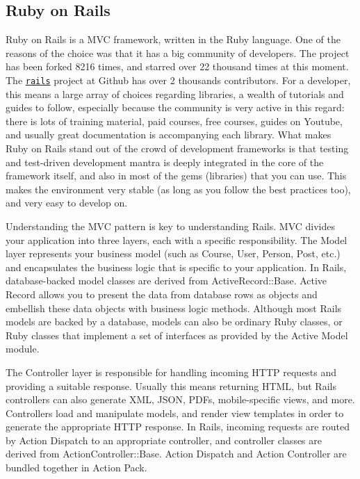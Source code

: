 \subsection{Ruby on Rails}
Ruby on Rails is a MVC framework, written in the Ruby language. One of the reasons of the
choice was that it has a big community of developers. The project has been forked 8216 times,
and starred over 22 thousand times at this moment. The \href{https://github.com/rails/rails}{\texttt{rails}}
project at Github has over 2 thousands contributors.
For a developer, this means a large array of choices regarding libraries, a
wealth of tutorials and guides to follow, especially because the community is very
active in this regard: there is lots of training material, paid courses, free courses,
guides on Youtube, and usually great documentation is accompanying each library.
What makes Ruby on Rails stand out of the crowd of development frameworks is
that testing and test-driven development mantra is deeply
integrated in the core of the framework itself, and also in most of the gems
(libraries) that you can use. This makes the environment very stable (as long as you follow
the best practices too), and very easy to develop on.

Understanding the MVC pattern is key to understanding Rails. MVC divides your
application into three layers, each with a specific responsibility.
The Model layer represents your business model (such as Course, User, Person,
Post, etc.) and encapsulates the business logic that is specific to your
application. In Rails, database-backed model classes are derived from
ActiveRecord::Base. Active Record allows you to present the data from database
rows as objects and embellish these data objects with business logic methods.
Although most Rails models are backed by a database, models can also be ordinary
Ruby classes, or Ruby classes that implement a set of interfaces as provided by
the Active Model module.

The Controller layer is responsible for handling incoming HTTP requests and
providing a suitable response. Usually this means returning HTML, but Rails
controllers can also generate XML, JSON, PDFs, mobile-specific views, and more.
Controllers load and manipulate models, and render view templates in order to
generate the appropriate HTTP response. In Rails, incoming requests are routed
by Action Dispatch to an appropriate controller, and controller classes are
derived from ActionController::Base. Action Dispatch and Action Controller are
bundled together in Action Pack.

